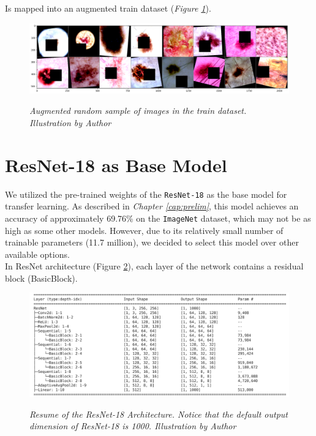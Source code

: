 Is mapped into an augmented train dataset (\textit{Figure \ref{fig:aug-sample-of-datasets}}).

\begin{figure}[H]
\centering
\includegraphics[width=\textwidth]{imatges/methodological_contribution/random-sample-of-isic-augmented.png}
\caption[Augmented random sample of images in the train dataset]{\textit{Augmented random sample of images in the train dataset. Illustration by Author}}
{\label{fig:aug-sample-of-datasets}}
\end{figure}

\newpage

\section{ResNet-18 as Base Model}

We utilized the pre-trained weights of the {\tt ResNet-18} as the base model for transfer learning. As described in \textit{Chapter \ref{cap:prelim}}, this model achieves an accuracy of approximately 69.76\% on the {\tt ImageNet} dataset, which may not be as high as some other models. However, due to its relatively small number of trainable parameters (11.7 million), we decided to select this model over other available options. \\

In ResNet architecture (Figure \ref{fig:resnet-18-arch}), each layer of the network contains a residual block (BasicBlock). 

\begin{figure}[H]
\begin{adjustbox}{width=\textwidth, trim={0.2cm 0pt 1.5cm 0pt}, clip}
\centering
\includegraphics[width=\textwidth]{imatges/methodological_contribution/residual-blocks.png}
\end{adjustbox}
\caption[Resume of the ResNet-18 Architecture]{\textit{Resume of the ResNet-18 Architecture. Notice that the default output dimension of ResNet-18 is 1000. Illustration by Author}}
{\label{fig:resnet-18-arch}}
\end{figure}

